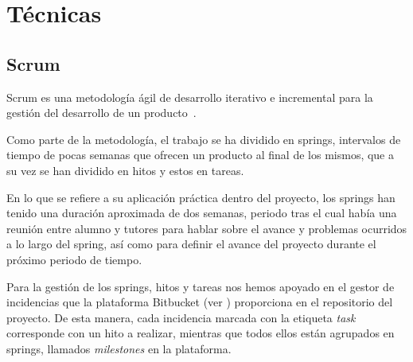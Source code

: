 

\section{Técnicas}
\subsection{Scrum}

Scrum es una metodología ágil de desarrollo iterativo e incremental para la gestión del desarrollo de un producto~\cite{wikiScrum}. 

Como parte de la metodología, el trabajo se ha dividido en springs, intervalos de tiempo de pocas semanas que ofrecen un producto al final de los mismos, que a su vez se han dividido en hitos y estos en tareas.

En lo que se refiere a su aplicación práctica dentro del proyecto, los springs han tenido una duración aproximada de dos semanas, periodo tras el cual había una reunión entre alumno y tutores para hablar sobre el avance y problemas ocurridos a lo largo del spring, así como para definir el avance del proyecto durante el próximo periodo de tiempo.


Para la gestión de los springs, hitos y tareas nos hemos apoyado en el gestor de incidencias que la plataforma Bitbucket (ver ) proporciona en el repositorio del proyecto. De esta manera, cada incidencia marcada con la etiqueta \textit{task} corresponde con un hito a realizar, mientras que todos ellos están agrupados en springs, llamados \textit{milestones} en la plataforma.

